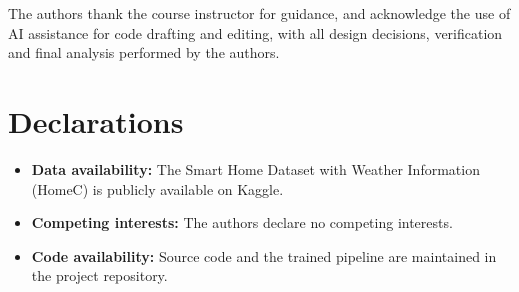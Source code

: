 \documentclass[pdflatex,sn-mathphys-num]{sn-jnl}%
\theoremstyle{thmstyleone}%
\theoremstyle{thmstyletwo}%
\theoremstyle{thmstylethree}%
\begin{document}
\backmatter

The authors thank the course instructor for guidance, and acknowledge the use of AI assistance for code drafting and editing, with all design decisions, verification and final analysis performed by the authors.

\section*{Declarations}

\begin{itemize}
\item \textbf{Data availability:} The Smart Home Dataset with Weather Information (HomeC) is publicly available on Kaggle.
\item \textbf{Competing interests:} The authors declare no competing interests.
\item \textbf{Code availability:} Source code and the trained pipeline are maintained in the project repository.
\end{itemize}


\end{document}
